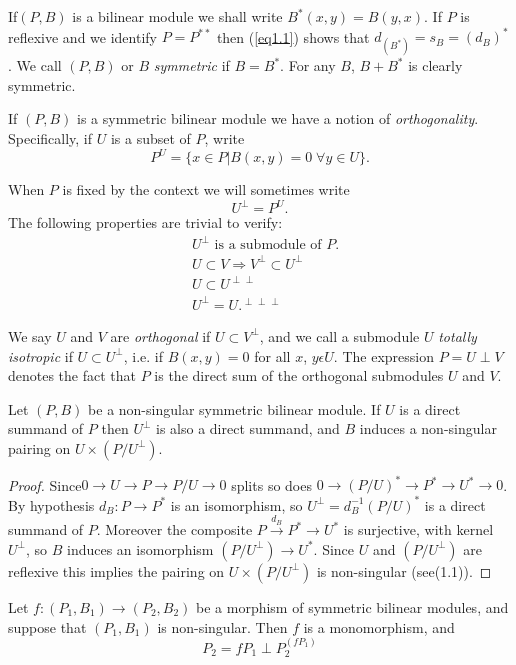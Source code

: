 If\pageoriginale $(P, B)$ is a bilinear module we shall write $B^\ast(x,
y) = B(y, x)$. If $P$ is reflexive and we identify $P = P^{\ast\ast}$ then
(\ref{eq1.1}) shows that $d_{(B^\ast)} = s_B = (d_B)^\ast$. We call
$(P, B)$ or $B$ \textit{symmetric} if $B = B^\ast$. For any $B$,
$B+B^\ast$ is clearly symmetric.  

If $(P, B)$ is a symmetric bilinear module we have a notion of
\textit{orthogonality}. Specifically, if $U$ is a subset of $P$, write  
$$
P^U = \{ x \in P|B(x, y)= 0 \; \forall y \in U \}. 
$$

When $P$ is fixed by the context we will sometimes write
$$
U^\perp = P^U.
$$
The following properties are trivial to verify:
\begin{align*}
& U^\perp \text{ is a submodule of } P. \\
& U \subset V \Rightarrow V^\perp \subset U^\perp \\
& U \subset U^{\perp \perp} \\
& U^\perp = U.^{\perp \perp \perp}
\end{align*}

We say $U$ and $V$ are \textit{orthogonal} if $U \subset V^\perp$, and
we call a submodule $U$ \textit{totally isotropic} if $U \subset
U^\perp$, i.e. if $B(x, y)=0$ for all $x$, $y \epsilon U$. The
expression $P = U \perp V$ denotes the fact that $P$ is the direct sum
of the orthogonal submodules $U$ and $V$. 

\setcounter{lemma}{1}
\begin{lemma}\label{chap5:lem1.2}%
Let $(P, B)$ be a non-singular symmetric bilinear module. If $U$ is a
direct summand of $P$ then $U^\perp$ is also a  direct summand, and
$B$ induces a non-singular pairing on $U \times (P/U^\perp)$. 
\end{lemma}

\begin{proof}
Since\pageoriginale $0 \to U \to P \to P/U \to 0$ splits so does $0
\to (P/U)^\ast \to P^\ast \to U^\ast \to 0$. By hypothesis $d_B : P
\to P^\ast$ is an isomorphism, 
so $U^\perp = d^{-1}_B (P/U)^\ast$ is a direct summand of $P$. Moreover
the composite $P \xrightarrow{d_B} P^\ast \to U^\ast$ is surjective, with
kernel $U^\perp$, so $B$ induces an isomorphism $(P/U^\perp) \to
U^\ast$. Since $U$ and $(P/U^\perp)$ are reflexive this implies the
pairing on $U \times (P/U^\perp)$ is non-singular (see(1.1)). 
\end{proof}

\begin{lemma}\label{chap5:lem1.3} %
 Let $f: (P_1, B_1) \to (P_2, B_2)$ be a morphism of symmetric
 bilinear modules, and suppose that $(P_1, B_1)$  is
 non-singular. Then $f$ is a monomorphism, and 
$$
P_2 = fP_1 \perp P^{(fP_1)}_2 
$$
\end{lemma}

